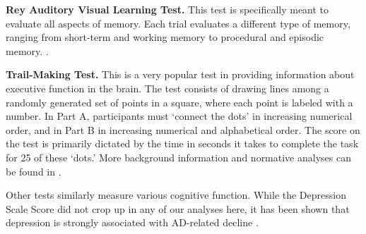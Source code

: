 {\bf Rey Auditory Visual Learning Test.} This test is specifically meant to evaluate all aspects of memory. Each trial evaluates a different type of memory, ranging from short-term and working memory to procedural and episodic memory. \cite{schmidt1996rey}.

{\bf Trail-Making Test.} This is a very popular test in providing information about executive function in the brain. The test consists of drawing lines among a randomly generated set of points in a square, where each point is labeled with a number. In Part A, participants must `connect the dots' in increasing numerical order, and in Part B in increasing numerical and alphabetical order. The score on the test is primarily dictated by the time in seconds it takes to complete the task for 25 of these `dots.' More background information and normative analyses can be found in \cite{tombaugh2004trail}.

Other tests similarly measure various cognitive function. While the Depression Scale Score did not crop up in any of our analyses here, it has been shown that depression is strongly associated with AD-related decline \cite{wragg1989overview}.